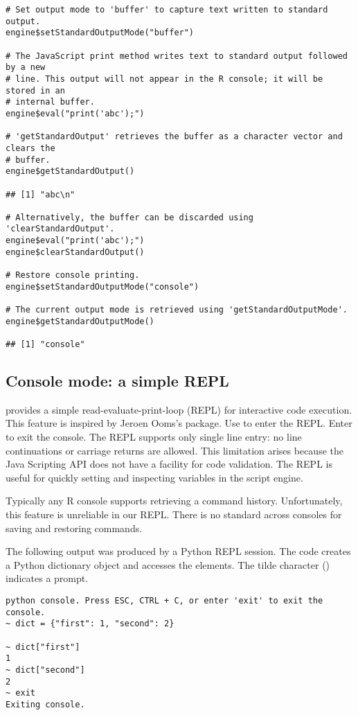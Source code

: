 \begin{verbatim}
# Set output mode to 'buffer' to capture text written to standard output.
engine$setStandardOutputMode("buffer")

# The JavaScript print method writes text to standard output followed by a new
# line. This output will not appear in the R console; it will be stored in an
# internal buffer.
engine$eval("print('abc');")

# 'getStandardOutput' retrieves the buffer as a character vector and clears the
# buffer.
engine$getStandardOutput()

## [1] "abc\n"

# Alternatively, the buffer can be discarded using 'clearStandardOutput'.
engine$eval("print('abc');")
engine$clearStandardOutput()

# Restore console printing.
engine$setStandardOutputMode("console")

# The current output mode is retrieved using 'getStandardOutputMode'.
engine$getStandardOutputMode()

## [1] "console"
\end{verbatim}

\subsection{Console mode: a simple REPL}

 provides a simple read-evaluate-print-loop (REPL) for interactive code execution. This feature is inspired by Jeroen Ooms's  package. Use  to enter the REPL. Enter  to exit the console. The REPL supports only single line entry: no line continuations or carriage returns are allowed. This limitation arises because the Java Scripting API does not have a facility for code validation. The REPL is useful for quickly setting and inspecting variables in the script engine.

Typically any R console supports retrieving a command history. Unfortunately, this feature is unreliable in our REPL. There is no standard across consoles for saving and restoring commands.

The following output was produced by a Python REPL session. The code creates a Python dictionary object and accesses the elements. The tilde character (\samp{$\sim$}) indicates a prompt.

\begin{verbatim}
python console. Press ESC, CTRL + C, or enter 'exit' to exit the console.
~ dict = {"first": 1, "second": 2}

~ dict["first"]
1
~ dict["second"]
2
~ exit
Exiting console.
\end{verbatim}

